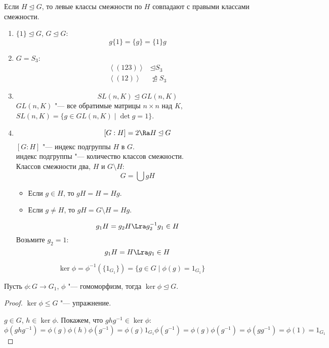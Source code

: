 \begin{conseq}
	Если $H \unlhd G$, то левые классы смежности по $H$ совпадают с правыми классами смежности.
\end{conseq}
\begin{exmp}\hfill\begin{enumerate}
\item
	$\{1\} \unlhd G$, $G \unlhd G$:
	\[ g\{1\} = \{g\} = \{1\}g \]

\item
	$G = S_3$:
	\begin{align*}
		\left<(123)\right> &\unlhd S_3 \\
		\left<(12)\right> &\ntrianglelefteq S_3
	\end{align*}

\item
	\[ SL(n, K) \unlhd GL(n, K) \]
	$GL(n, K)$ "--- все обратимые матрицы $n \times n$ над $K$,
	$SL(n, K) = \{g \in GL(n, K) \mid \det g = 1 \}$.

\item
	\[ [G:H] = 2 \Ra H \unlhd G \]
	$[G:H]$ "--- индекс подгруппы $H$ в $G$.\\
	индекс подгруппы "--- количество классов смежности.\\
	Классов смежности два, $H$ и $G \setminus H$:
	\[ G = \bigcup gH \]
	\begin{itemize}
		\item Если $g \in H$, то $gH = H = Hg$.
		\item Если $g \ne H$, то $gH = G \setminus H = Hg$.
	\end{itemize}
	\[ g_1H = g_2H \Lra g_2^{-1}g_1 \in H \]
	Возьмите $g_2 = 1$:
	\[ g_1H = H \Lra g_1 \in H \]
\end{enumerate}\end{exmp}

\begin{Def}
\[ \ker \phi = \phi^{-1}(\{1_{G_1}\}) = \{g \in G \mid \phi(g) = 1_{G_1}\} \]
\end{Def}

\begin{theorem}
	Пусть $\phi\colon G \to G_1$, $\phi$ "--- гомоморфизм,
	тогда $\ker \phi \unlhd G$.
\end{theorem}
\begin{proof}
	$\ker \phi \le G$ "--- упражнение.

	$g \in G$, $h \in \ker \phi$.
	Покажем, что $ghg^{-1} \in \ker \phi$:
	\[
		\phi(ghg^{-1}) = \phi(g)\phi(h)\phi(g^{-1}) = \phi(g)1_{G_1}\phi(g^{-1}) = \phi(g)\phi(g^{-1}) = \phi(gg^{-1}) = \phi(1) = 1_{G_1}
	\]
\end{proof}

